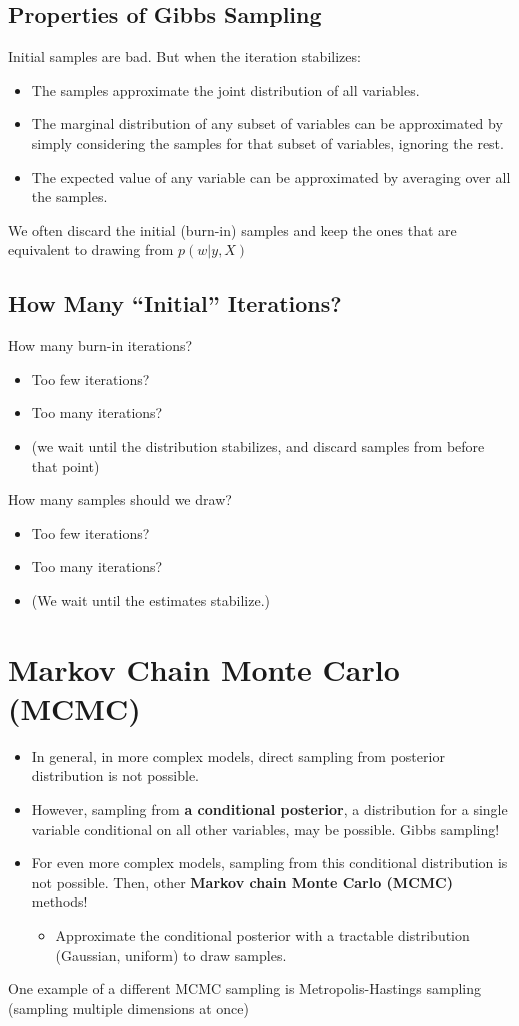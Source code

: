 \documentclass[10pt]{article}
\begin{document}
\subsection*{Properties of Gibbs Sampling}
Initial samples are bad.  But when the iteration stabilizes:
\begin{itemize}
	\item The samples approximate the joint distribution of all variables.
	\item The marginal distribution of any subset of variables can be approximated by simply considering the samples for that subset of variables, ignoring the rest.
	\item The expected value of any variable can be approximated by averaging over all the samples.
\end{itemize}
We often discard the initial (burn-in) samples and keep the ones that are equivalent to drawing from $p(w | y, X)$

\subsection*{How Many ``Initial'' Iterations?}
How many burn-in iterations?
\begin{itemize}
	\item Too few iterations?
	\item Too many iterations?
	\item (we wait until the distribution stabilizes, and discard samples from before that point)
\end{itemize}
How many samples should we draw?
\begin{itemize}
	\item Too few iterations?
	\item Too many iterations?
	\item (We wait until the estimates stabilize.)
\end{itemize}

\section*{Markov Chain Monte Carlo (MCMC)}
\begin{itemize}
	\item In general, in more complex models, direct sampling from posterior distribution is not possible. 
	\item However, sampling from \textbf{a conditional posterior}, a distribution for a single variable conditional on all other variables, may be possible.  Gibbs sampling!
	\item For even more complex models, sampling from this conditional distribution is not possible.  Then, other \textbf{Markov chain Monte Carlo (MCMC)} methods!
	\begin{itemize}
	    \item Approximate the conditional posterior with a tractable distribution (Gaussian, uniform) to draw samples.
    \end{itemize}
\end{itemize}
One example of a different MCMC sampling is Metropolis-Hastings sampling (sampling multiple dimensions at once)
\end{document}
